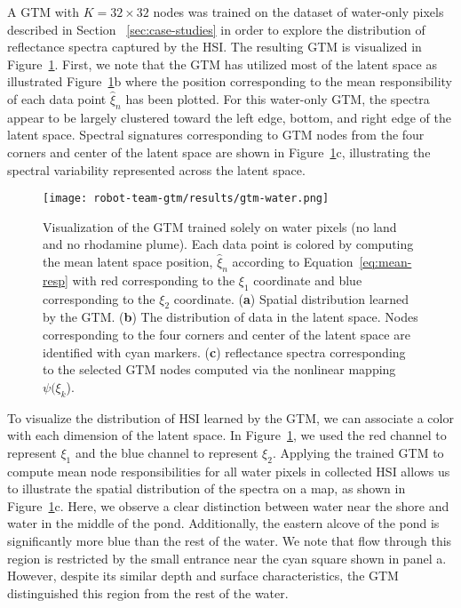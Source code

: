 A GTM with $K=32\times 32$ nodes was trained on the dataset of water-only pixels
described in Section ~\ref{sec:case-studies} in order to explore the
distribution of reflectance spectra captured by the HSI. The resulting GTM is
visualized in Figure~\ref{fig:gtm-water}. First, we note that the GTM has
utilized most of the latent space as illustrated  Figure~\ref{fig:gtm-water}b
where the position corresponding to the mean responsibility of each data point
$\hat{\xi}_n$ has been plotted. For this water-only GTM, the spectra appear to
be largely clustered toward the left edge, bottom, and right edge of the latent
space. Spectral signatures corresponding to GTM nodes from the four corners and
center of the latent space are shown in Figure~\ref{fig:gtm-water}c,
illustrating the spectral variability represented across the latent space.

\begin{figure}[H]
  \centering
  \texttt{[image: robot-team-gtm/results/gtm-water.png]}
  \caption{Visualization of the GTM trained solely on water pixels (no land and
    no rhodamine plume). Each data point is colored by computing the mean latent
    space position, $\hat{\xi}_n$ according to Equation~\eqref{eq:mean-resp}
    with red corresponding to the $\xi_1$ coordinate and blue corresponding to
    the $\xi_2$ coordinate. (\textbf{a}) Spatial distribution learned by the
    GTM. (\textbf{b}) The distribution of data in the latent space. Nodes
    corresponding to the four corners and center of the latent space are
    identified with cyan markers. (\textbf{c}) reflectance spectra corresponding
    to the selected GTM nodes computed via the nonlinear mapping
    $\psi(\xi_k$).}
  \label{fig:gtm-water}
\end{figure}

To visualize the distribution of HSI learned by the GTM, we can associate a
color with each dimension of the latent space. In Figure~\ref{fig:gtm-water}, we
used the red channel to represent $\xi_1$ and the blue channel to represent
$\xi_2$. Applying the trained GTM to compute mean node responsibilities for all
water pixels in collected HSI allows us to illustrate the spatial distribution
of the spectra on a map, as shown in Figure~\ref{fig:gtm-water}c. Here, we
observe a clear distinction between water near the shore and water in the middle
of the pond. Additionally, the eastern alcove of the pond is significantly more
blue than the rest of the water. We note that flow through this region is
restricted by the small entrance near the cyan square shown in panel a. However,
despite its similar depth and surface characteristics, the GTM distinguished
this region from the rest of the water.

